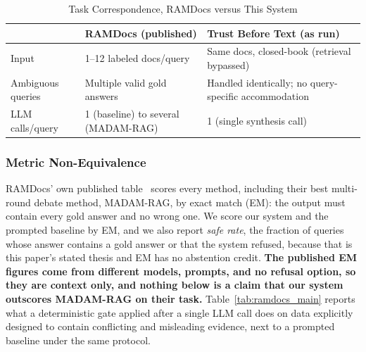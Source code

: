 \documentclass[conference]{IEEEtran}
\begin{document}
\begin{table}[htbp]
\caption{Task Correspondence, RAMDocs versus This System}
\label{tab:ramdocs_task}
\centering
\small
\begin{tabularx}{\columnwidth}{@{}l X X@{}}
\toprule
 & RAMDocs (published) & Trust Before Text (as run) \\
\midrule
Input & 1--12 labeled docs/query & Same docs, closed-book (retrieval bypassed) \\
Ambiguous queries & Multiple valid gold answers & Handled identically; no query-specific accommodation \\
LLM calls/query & 1 (baseline) to several (MADAM-RAG) & 1 (single synthesis call) \\
\bottomrule
\end{tabularx}
\end{table}

\subsubsection{Metric Non-Equivalence}
RAMDocs' own published table~\cite{wang2025ramdocs} scores every method,
including their best multi-round debate method, MADAM-RAG, by exact match
(EM): the output must contain every gold answer and no wrong one. We score
our system and the prompted baseline by EM, and we also report
\textit{safe rate}, the fraction of queries whose answer contains a gold
answer or that the system refused, because that is this paper's stated
thesis and EM has no abstention credit. \textbf{The published EM figures
come from different models, prompts, and no refusal option, so they are
context only, and nothing below is a claim that our system outscores
MADAM-RAG on their task.} Table~\ref{tab:ramdocs_main} reports what a
deterministic gate applied after a single LLM call does on data explicitly
designed to contain conflicting and misleading evidence, next to a prompted
baseline under the same protocol.
\end{document}
